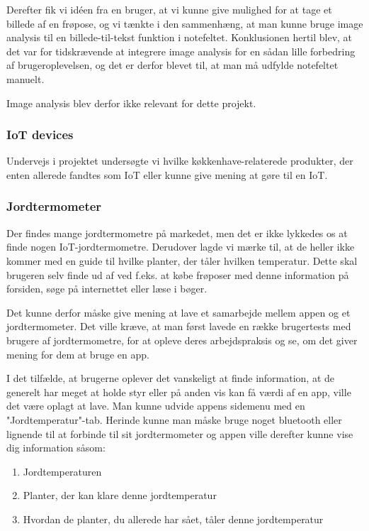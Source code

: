 Derefter fik vi idéen fra en bruger, at vi kunne give mulighed for at tage et billede af en frøpose, og vi tænkte i den sammenhæng, at man kunne bruge image analysis til en billede-til-tekst funktion i notefeltet. Konklusionen hertil blev, at det var for tidskrævende at integrere image analysis for en sådan lille forbedring af brugeroplevelsen, og det er derfor blevet til, at man må udfylde notefeltet manuelt. 

Image analysis blev derfor ikke relevant for dette projekt.

\subsubsection{IoT devices}
Undervejs i projektet undersøgte vi hvilke køkkenhave-relaterede produkter, der enten allerede fandtes som IoT eller kunne give mening at gøre til en IoT.

\subsubsection*{Jordtermometer}
Der findes mange jordtermometre på markedet, men det er ikke lykkedes os at finde nogen IoT-jordtermometre. Derudover lagde vi mærke til, at de heller ikke kommer med en guide til hvilke planter, der tåler hvilken temperatur. Dette skal brugeren selv finde ud af ved f.eks. at købe frøposer med denne information på forsiden, søge på internettet eller læse i bøger. 

Det kunne derfor måske give mening at lave et samarbejde mellem appen og et jordtermometer. Det ville kræve, at man først lavede en række brugertests med brugere af jordtermometre, for at opleve deres arbejdspraksis og se, om det giver mening for dem at bruge en app.

I det tilfælde, at brugerne oplever det vanskeligt at finde information, at de generelt har meget at holde styr eller på anden vis kan få værdi af en app, ville det være oplagt at lave. Man kunne udvide appens sidemenu med en "Jordtemperatur"-tab. Herinde kunne man måske bruge noget bluetooth eller lignende til at forbinde til sit jordtermometer og appen ville derefter kunne vise dig information såsom:

\begin{enumerate}
    \item{Jordtemperaturen}
    \item{Planter, der kan klare denne jordtemperatur}
    \item{Hvordan de planter, du allerede har sået, tåler denne jordtemperatur}
\end{enumerate}

